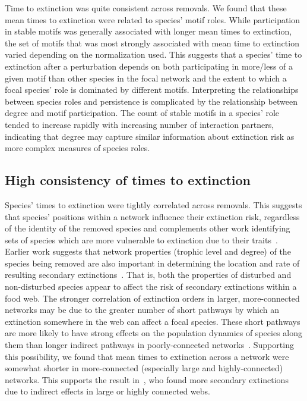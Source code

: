 \documentclass[12pt]{article}
\begin{document}
    Time to extinction was quite consistent across removals. 
    We found that these mean times to extinction were related to species' motif roles.
    While participation in stable motifs was generally associated with longer mean times to extinction, the set of motifs that was most strongly associated with mean time to extinction varied depending on the normalization used.
    This suggests that a species' time to extinction after a perturbation depends on both participating in more/less of a given motif than other species in the focal network and the extent to which a focal species' role is dominated by different motifs.
    Interpreting the relationships between species roles and persistence is complicated by the relationship between degree and motif participation.
    The count of stable motifs in a species' role tended to increase rapidly with increasing number of interaction partners, indicating that degree may capture similar information about extinction risk as more complex measures of species roles.



  \subsection*{High consistency of times to extinction}

    Species' times to extinction were tightly correlated across removals. 
    This suggests that species' positions within a network influence their extinction risk, regardless of the identity of the removed species and complements other work identifying sets of species which are more vulnerable to extinction due to their traits~\citep{Curtsdotter2011,Ryser2019}. 
    Earlier work suggests that network properties (trophic level and degree) of the species being removed are also important in determining the location and rate of resulting secondary extinctions~\citep{Wootton2016a,Dunne2002}.
    That is, both the properties of disturbed and non-disturbed species appear to affect the risk of secondary extinctions within a food web.
    The stronger correlation of extinction orders in larger, more-connected networks may be due to the greater number of short pathways by which an extinction somewhere in the web can affect a focal species. 
    These short pathways are more likely to have strong effects on the population dynamics of species along them than longer indirect pathways in poorly-connected networks~\citep{Jordan2002,Jordan2006}.
    Supporting this possibility, we found that mean times to extinction across a network were somewhat shorter in more-connected (especially large and highly-connected) networks.
    This supports the result in~\citet{Wootton2016a}, who found more secondary extinctions due to indirect effects in large or highly connected webs. 
\end{document}

